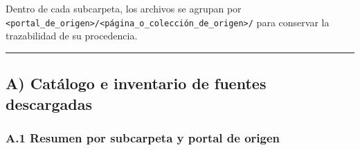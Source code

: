 \documentclass[11pt,a4paper]{article}
\begin{document}
Dentro de cada subcarpeta, los archivos se agrupan por \texttt{\textless{}portal\_\allowbreak{}de\_\allowbreak{}origen\textgreater{}/\allowbreak{}\textless{}página\_\allowbreak{}o\_\allowbreak{}colección\_\allowbreak{}de\_\allowbreak{}origen\textgreater{}/\allowbreak{}} para conservar la trazabilidad de su procedencia.

\medskip\noindent\rule{\linewidth}{0.4pt}\medskip

\subsection*{A) Catálogo e inventario de fuentes descargadas}

\subsubsection*{A.1 Resumen por subcarpeta y portal de origen}
\end{document}
